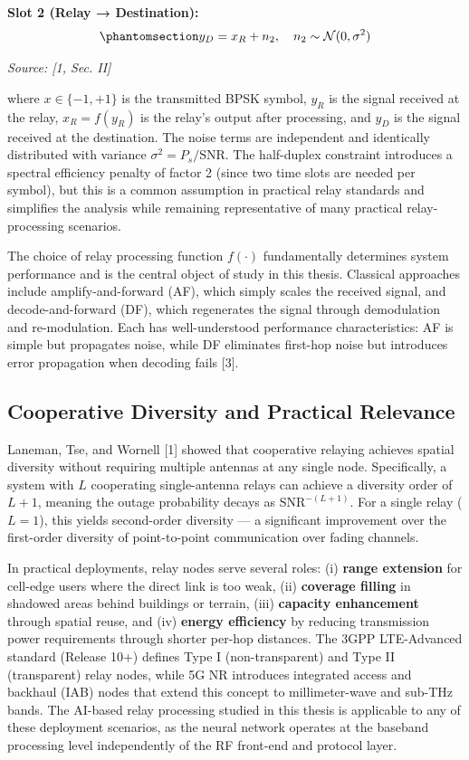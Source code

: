 \textbf{Slot 2 (Relay → Destination):} \begin{equation}\protect\phantomsection\label{eq:awgn-hop2}{y_D = x_R + n_2, \quad n_2 \sim \mathcal{N}(0, \sigma^2)
}\end{equation} \par{\small\textit{Source: [1, Sec. II]}}

where \(x \in \{-1, +1\}\) is the transmitted BPSK symbol, \(y_R\) is the signal received at the relay, \(x_R = f(y_R)\) is the relay's output after processing, and \(y_D\) is the signal received at the destination. The noise terms are independent and identically distributed with variance \(\sigma^2 = P_s / \text{SNR}\). The half-duplex constraint introduces a spectral efficiency penalty of factor 2 (since two time slots are needed per symbol), but this is a common assumption in practical relay standards and simplifies the analysis while remaining representative of many practical relay-processing scenarios.

The choice of relay processing function \(f(\cdot)\) fundamentally determines system performance and is the central object of study in this thesis. Classical approaches include amplify-and-forward (AF), which simply scales the received signal, and decode-and-forward (DF), which regenerates the signal through demodulation and re-modulation. Each has well-understood performance characteristics: AF is simple but propagates noise, while DF eliminates first-hop noise but introduces error propagation when decoding fails {[}3{]}.

\subsection{Cooperative Diversity and Practical Relevance}\label{sec:cooperative-diversity-and-practical-relevance}

Laneman, Tse, and Wornell {[}1{]} showed that cooperative relaying achieves spatial diversity without requiring multiple antennas at any single node. Specifically, a system with \(L\) cooperating single-antenna relays can achieve a diversity order of \(L + 1\), meaning the outage probability decays as \(\text{SNR}^{-(L+1)}\). For a single relay (\(L=1\)), this yields second-order diversity --- a significant improvement over the first-order diversity of point-to-point communication over fading channels.

In practical deployments, relay nodes serve several roles: (i) \textbf{range extension} for cell-edge users where the direct link is too weak, (ii) \textbf{coverage filling} in shadowed areas behind buildings or terrain, (iii) \textbf{capacity enhancement} through spatial reuse, and (iv) \textbf{energy efficiency} by reducing transmission power requirements through shorter per-hop distances. The 3GPP LTE-Advanced standard (Release 10+) defines Type I (non-transparent) and Type II (transparent) relay nodes, while 5G NR introduces integrated access and backhaul (IAB) nodes that extend this concept to millimeter-wave and sub-THz bands. The AI-based relay processing studied in this thesis is applicable to any of these deployment scenarios, as the neural network operates at the baseband processing level independently of the RF front-end and protocol layer.

